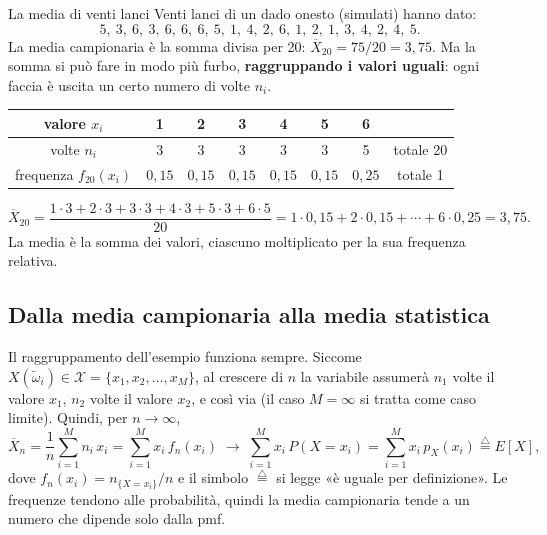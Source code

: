\begin{esempio}{La media di venti lanci}
Venti lanci di un dado onesto (simulati) hanno dato:
\[ 5,\ 3,\ 6,\ 3,\ 6,\ 6,\ 6,\ 5,\ 1,\ 4,\ 2,\ 6,\ 1,\ 2,\ 1,\ 3,\ 4,\ 2,\ 4,\ 5 . \]
La media campionaria è la somma divisa per 20: $\overline{X}_{20} = 75/20 = 3{,}75$. Ma la somma si può fare in modo più
furbo, \textbf{raggruppando i valori uguali}: ogni faccia è uscita un certo numero di volte $n_i$.
\begin{center}
\renewcommand{\arraystretch}{1.25}
\begin{tabular}{@{}c|cccccc|c@{}}
  valore $x_i$ & 1 & 2 & 3 & 4 & 5 & 6 & \\ \hline
  volte $n_i$ & 3 & 3 & 3 & 3 & 3 & 5 & totale 20 \\
  frequenza $f_{20}(x_i)$ & $0{,}15$ & $0{,}15$ & $0{,}15$ & $0{,}15$ & $0{,}15$ & $0{,}25$ & totale 1 \\
\end{tabular}
\end{center}
\[
  \overline{X}_{20} = \frac{1 \cdot 3 + 2 \cdot 3 + 3 \cdot 3 + 4 \cdot 3 + 5 \cdot 3 + 6 \cdot 5}{20}
  = 1 \cdot 0{,}15 + 2 \cdot 0{,}15 + \cdots + 6 \cdot 0{,}25 = 3{,}75 .
\]
La media è la somma dei valori, ciascuno moltiplicato per la sua frequenza relativa.
\end{esempio}

\subsection{Dalla media campionaria alla media statistica}

Il raggruppamento dell'esempio funziona sempre. Siccome $X(\tilde\omega_i) \in \mathcal{X} = \{x_1, x_2, \ldots,
x_M\}$, al crescere di $n$ la variabile assumerà $n_1$ volte il valore $x_1$, $n_2$ volte il valore $x_2$, e così via
(il caso $M = \infty$ si tratta come caso limite). Quindi, per $n \to \infty$,
\[
  \overline{X}_n = \frac{1}{n} \sum_{i=1}^{M} n_i\, x_i = \sum_{i=1}^{M} x_i\, f_n(x_i)
  \;\longrightarrow\; \sum_{i=1}^{M} x_i\, P(X = x_i) = \sum_{i=1}^{M} x_i\, p_X(x_i) \stackrel{\triangle}{=} E[X] ,
\]
dove $f_n(x_i) = n_{\{X = x_i\}}/n$ e il simbolo $\stackrel{\triangle}{=}$ si legge «è uguale per definizione». Le
frequenze tendono alle probabilità, quindi la media campionaria tende a un numero che dipende solo dalla pmf.


